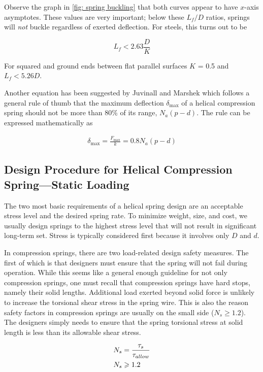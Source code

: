 \documentclass[
10pt,
a4paper,
openany,
svgnames,
]{book}
\begin{document}
Observe the graph in \cref{fig: spring buckling} that both curves appear to have $x$-axis asymptotes. These values are very important; below these $L_f/D$ ratios, springs will \emph{not} buckle regardless of exerted deflection. For steels, this turns out to be

\begin{equation}
  L_f < 2.63 \frac{D}{K}
\end{equation}

For squared and ground ends between flat parallel surfaces $K$ = 0.5 and $L_f < 5.26 D$.

Another equation has been suggested by Juvinall and Marshek \cite{juvinall2006fundamentals} which follows a general rule of thumb that the maximum deflection $\delta_{\max}$ of a helical compression spring should not be more than 80\% of its range, $N_a(p - d)$. The rule can be expressed mathematically as

\begin{align}
  \label{eq: pitch find equation}
  \delta_{\max} = \frac{F_{\max}}{k} = 0.8N_a(p-d)
\end{align}

\subsection{Design Procedure for Helical Compression Spring—Static Loading}

The two most basic requirements of a helical spring design are an acceptable stress level and the desired spring rate. To minimize weight, size, and cost, we usually design springs to the highest stress level that will not result in significant long-term set. Stress is typically considered first because it involves only $D$ and $d$.

In compression springs, there are two load-related design safety measures. The first of which is that designers must ensure that the spring will not fail during operation. While this seems like a general enough guideline for not only compression springs, one must recall that compression springs have hard stops, namely their solid lengths. Additional load exerted beyond solid force is unlikely to increase the torsional shear stress in the spring wire. This is also the reason safety factors in compression springs are usually on the small side ($N_s \geq 1.2$). The designers simply needs to ensure that the spring torsional stress at solid length is less than its allowable shear stress.

\begin{equation} \label{eqn: spring allowable stress}
  \begin{gathered}
    N_s = \frac{\tau _s}{\tau _{allow}} \hfill \\
    N_s \geqslant 1.2 \hfill \\ 
  \end{gathered}
\end{equation}
\end{document}
